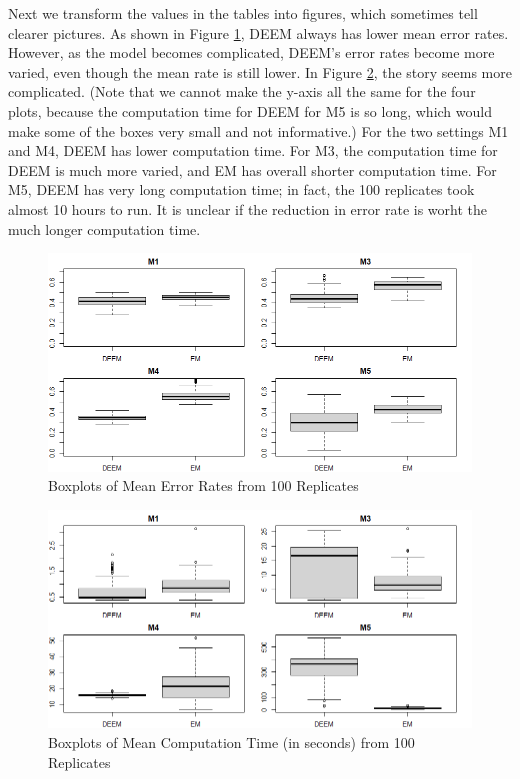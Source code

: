 \documentclass[11pt]{article}
\begin{document}
Next we transform the values in the tables into figures, which sometimes tell clearer pictures. As shown in Figure \ref{fig:err}, DEEM always has lower mean error rates. However, as the model becomes complicated, DEEM's error rates become more varied, even though the mean rate is still lower. In Figure \ref{fig:time}, the story seems more complicated. (Note that we cannot make the y-axis all the same for the four plots, because the computation time for DEEM for M5 is so long, which would make some of the boxes very small and not informative.) For the two settings M1 and M4, DEEM has lower computation time. For M3, the computation time for DEEM is much more varied, and EM has overall shorter computation time. For M5, DEEM has very long computation time; in fact, the 100 replicates took almost 10 hours to run. It is unclear if the reduction in error rate is worht the much longer computation time.

\begin{figure}
    \centering
    \includegraphics[width = 16 cm]{sim_error.png}
    \caption{Boxplots of Mean Error Rates from 100 Replicates}
    \label{fig:err}
\end{figure}

\begin{figure}
    \centering
    \includegraphics[width = 16 cm]{sim_time.png}
    \caption{Boxplots of Mean Computation Time (in seconds) from 100 Replicates}
    \label{fig:time}
\end{figure}
\end{document}
